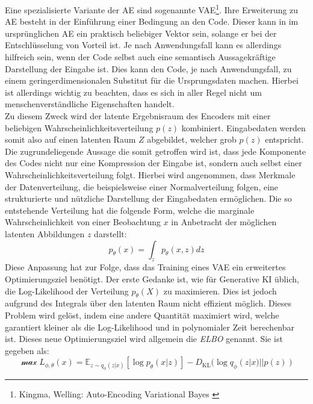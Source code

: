 Eine spezialisierte Variante der \ac{AE} sind sogenannte \ac{VAE}\footnote{
    Kingma, Welling: Auto-Encoding Variational Bayes
    \cite{kingma2013auto}
}. Ihre Erweiterung zu \ac{AE} besteht in der Einführung einer Bedingung an den Code. Dieser kann in im ursprünglichen \ac{AE} ein praktisch beliebiger Vektor sein, solange er bei der Entschlüsselung von Vorteil ist. Je nach Anwendungsfall kann es allerdings hilfreich sein, wenn der Code selbst auch eine semantisch Aussagekräftige Darstellung der Eingabe ist. Dies kann den Code, je nach Anwendungsfall, zu einem geringerdimensionalen Substitut für die Ursprungsdaten machen. Hierbei ist allerdings wichtig zu beachten, dass es sich in aller Regel nicht um menschenverständliche Eigenschaften handelt. \\
Zu diesem Zweck wird der latente Ergebnisraum des Encoders mit einer beliebigen Wahrscheinlichkeitsverteilung $p(z)$ kombiniert. Eingabedaten werden somit also auf einen latenten Raum $Z$ abgebildet, welcher grob $p(z)$ entspricht. \\
Die zugrundeliegende Aussage die somit getroffen wird ist, dass jede Komponente des Codes nicht nur eine Kompression der Eingabe ist, sondern auch selbst einer Wahrscheinlichkeitsverteilung folgt. Hierbei wird angenommen, dass Merkmale der Datenverteilung, die beispielsweise einer Normalverteilung folgen, eine strukturierte und nützliche Darstellung der Eingabedaten ermöglichen. Die so entstehende Verteilung hat die folgende Form, welche die marginale Wahrscheinlichkeit von einer Beobachtung $x$ in Anbetracht der möglichen latenten Abbildungen $z$ darstellt:
\begin{equation}
    p_\theta(x) = \int_z p_\theta(x, z) dz
\end{equation}
Diese Anpassung hat zur Folge, dass das Training eines \ac{VAE} ein erweitertes Optimierungsziel benötigt. Der erste Gedanke ist, wie für Generative \ac{KI} üblich, die Log-Likelihood der Verteilung $p_\theta(X)$ zu maximieren. Dies ist jedoch aufgrund des Integrals über den latenten Raum nicht effizient möglich. Dieses Problem wird gelöst, indem eine andere Quantität maximiert wird, welche garantiert kleiner als die Log-Likelihood und in polynomialer Zeit berechenbar ist. Dieses neue Optimierungsziel wird allgemein die \textit{\ac{ELBO}} genannt. Sie ist gegeben als:
\begin{equation}
    \mathcal \max L_{\phi, \theta}(x) = \mathbb E_{z \sim q_{\phi}(z|x)}
    \left [
        \log p_\theta(x|z)
    \right ]
    - D_\text{KL} (\log q_{\phi}(z|x) || p(z))
\end{equation}
